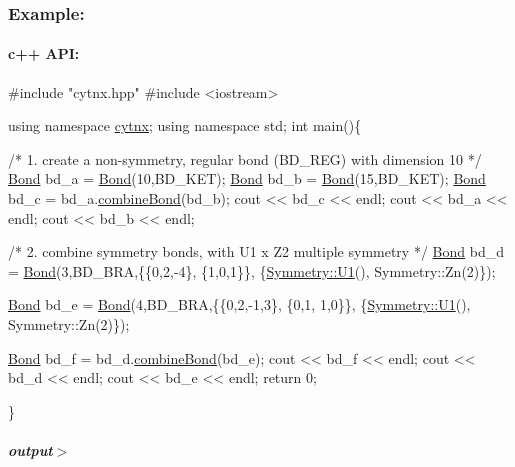 \subsubsection*{Example\+:}

\paragraph*{c++ A\+PI\+:}


\begin{DoxyCodeInclude}
\textcolor{preprocessor}{#include "cytnx.hpp"}
\textcolor{preprocessor}{#include <iostream>}


\textcolor{keyword}{using namespace }\hyperlink{namespacecytnx}{cytnx};
\textcolor{keyword}{using namespace }std;
\textcolor{keywordtype}{int} main()\{ 

    \textcolor{comment}{/* 1.}
\textcolor{comment}{        create a non-symmetry, regular bond (BD\_REG) }
\textcolor{comment}{        with dimension 10}
\textcolor{comment}{    */}
    \hyperlink{classcytnx_1_1Bond}{Bond} bd\_a = \hyperlink{classcytnx_1_1Bond}{Bond}(10,BD\_KET);
    \hyperlink{classcytnx_1_1Bond}{Bond} bd\_b = \hyperlink{classcytnx_1_1Bond}{Bond}(15,BD\_KET);
    \hyperlink{classcytnx_1_1Bond}{Bond} bd\_c = bd\_a.\hyperlink{classcytnx_1_1Bond_a609c034885efa32fc244be82a56e1f8c}{combineBond}(bd\_b);
    cout << bd\_c << endl;
    cout << bd\_a << endl;
    cout << bd\_b << endl;

    \textcolor{comment}{/* 2.}
\textcolor{comment}{        combine symmetry bonds, }
\textcolor{comment}{        with U1 x Z2 multiple symmetry }
\textcolor{comment}{    */}
    \hyperlink{classcytnx_1_1Bond}{Bond} bd\_d = \hyperlink{classcytnx_1_1Bond}{Bond}(3,BD\_BRA,\{\{0,2,-4\},
                               \{1,0,1\}\},
                              \{\hyperlink{classcytnx_1_1Symmetry_a9218fd66fc9cca64cd3d792e0019592a}{Symmetry::U1}(),
                               Symmetry::Zn(2)\});
                                
    \hyperlink{classcytnx_1_1Bond}{Bond} bd\_e = \hyperlink{classcytnx_1_1Bond}{Bond}(4,BD\_BRA,\{\{0,2,-1,3\},
                               \{0,1, 1,0\}\},
                              \{\hyperlink{classcytnx_1_1Symmetry_a9218fd66fc9cca64cd3d792e0019592a}{Symmetry::U1}(),
                               Symmetry::Zn(2)\});

    \hyperlink{classcytnx_1_1Bond}{Bond} bd\_f = bd\_d.\hyperlink{classcytnx_1_1Bond_a609c034885efa32fc244be82a56e1f8c}{combineBond}(bd\_e);
    cout << bd\_f << endl;
    cout << bd\_d << endl;
    cout << bd\_e << endl;
    \textcolor{keywordflow}{return} 0;
    


\}

\end{DoxyCodeInclude}
 \subparagraph*{output$>$}


